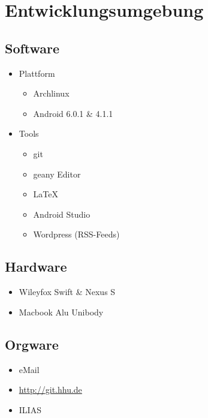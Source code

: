 \section{Entwicklungsumgebung}

\subsection{Software}

\begin{itemize}
  \item Plattform
    \begin{itemize}
      \item Archlinux
      \item Android 6.0.1 \& 4.1.1
    \end{itemize}
  \item Tools
    \begin{itemize}
      \item git
      \item geany Editor
      \item \LaTeX
      \item Android Studio
      \item Wordpress (RSS-Feeds)
    \end{itemize}
\end{itemize}

\subsection{Hardware}

\begin{itemize}
  \item Wileyfox Swift \& Nexus S
  \item Macbook Alu Unibody
\end{itemize}

\subsection{Orgware}

\begin{itemize}
  \item eMail
  \item \url{http://git.hhu.de}
  \item ILIAS
\end{itemize}
